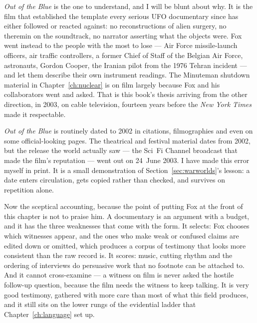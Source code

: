 \emph{Out of the Blue} is the one to understand, and I will be blunt about why. It is the film that
established the template every serious UFO documentary since has either followed or reacted against:
no reconstructions of alien surgery, no theremin on the soundtrack, no narrator asserting what the
objects were. Fox went instead to the people with the most to lose --- Air Force missile-launch
officers, air traffic controllers, a former Chief of Staff of the Belgian Air Force, astronauts,
Gordon Cooper, the Iranian pilot from the 1976 Tehran incident --- and let them describe their own
instrument readings. The Minuteman shutdown material in Chapter~\ref{ch:nuclear} is on film largely
because Fox and his collaborators went and asked.  That is this book's thesis arriving from the other direction, in 2003, on cable
television, fourteen years before the \emph{New York Times} made it respectable.

\begin{funfact}
\emph{Out of the Blue} is routinely dated to 2002 in citations, filmographies and even on some
official-looking pages. The theatrical and festival material dates from 2002, but the release the
world actually saw --- the Sci~Fi Channel broadcast that made the film's reputation --- went out on
24~June 2003. I have made this error myself in print. It is a small demonstration of
Section~\ref{sec:warworlds}'s lesson: a date enters circulation, gets copied rather than checked, and
survives on repetition alone.
\end{funfact}

Now the sceptical accounting, because the point of putting Fox at the front of this chapter is not to
praise him. A documentary is an argument with a budget, and it has the three weaknesses that come
with the form. It selects: Fox chooses which witnesses appear, and the ones who make weak or
confused claims are edited down or omitted, which produces a corpus of testimony that looks more
consistent than the raw record is. It scores: music, cutting rhythm and the ordering of interviews
do persuasive work that no footnote can be attached to. And it cannot cross-examine --- a witness on
film is never asked the hostile follow-up question, because the film needs the witness to keep
talking.  It is very good testimony, gathered with more
care than most of what this field produces, and it still sits on the lower rungs of the evidential
ladder that Chapter~\ref{ch:language} set up.

